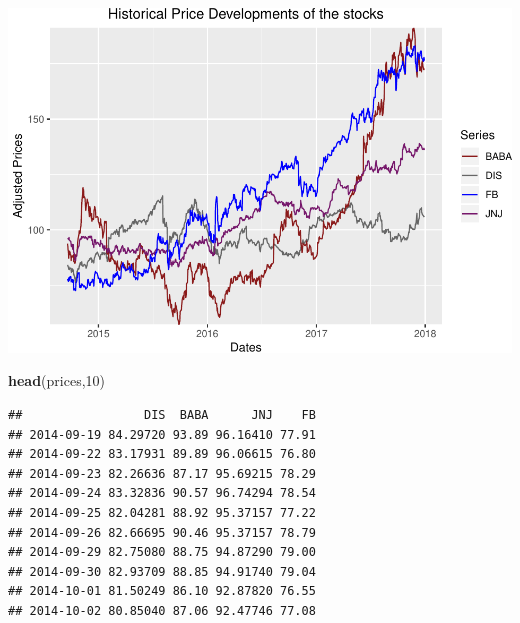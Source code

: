 \documentclass[]{article}
\newenvironment{Shaded}{\begin{snugshade}}{\end{snugshade}}
\newcommand{\KeywordTok}[1]{\textcolor[rgb]{0.13,0.29,0.53}{\textbf{#1}}}
\newcommand{\DataTypeTok}[1]{\textcolor[rgb]{0.13,0.29,0.53}{#1}}
\newcommand{\DecValTok}[1]{\textcolor[rgb]{0.00,0.00,0.81}{#1}}
\newcommand{\StringTok}[1]{\textcolor[rgb]{0.31,0.60,0.02}{#1}}
\newcommand{\OperatorTok}[1]{\textcolor[rgb]{0.81,0.36,0.00}{\textbf{#1}}}
\newcommand{\NormalTok}[1]{#1}
\begin{document}
\begin{Shaded}
\end{Shaded}

\includegraphics{Markowitz_Research_Me_files/figure-latex/unnamed-chunk-2-1.pdf}

\begin{Shaded}
\begin{Highlighting}[]
\KeywordTok{head}\NormalTok{(prices,}\DecValTok{10}\NormalTok{)}
\end{Highlighting}
\end{Shaded}

\begin{verbatim}
##                 DIS  BABA      JNJ    FB
## 2014-09-19 84.29720 93.89 96.16410 77.91
## 2014-09-22 83.17931 89.89 96.06615 76.80
## 2014-09-23 82.26636 87.17 95.69215 78.29
## 2014-09-24 83.32836 90.57 96.74294 78.54
## 2014-09-25 82.04281 88.92 95.37157 77.22
## 2014-09-26 82.66695 90.46 95.37157 78.79
## 2014-09-29 82.75080 88.75 94.87290 79.00
## 2014-09-30 82.93709 88.85 94.91740 79.04
## 2014-10-01 81.50249 86.10 92.87820 76.55
## 2014-10-02 80.85040 87.06 92.47746 77.08
\end{verbatim}
\end{document}
